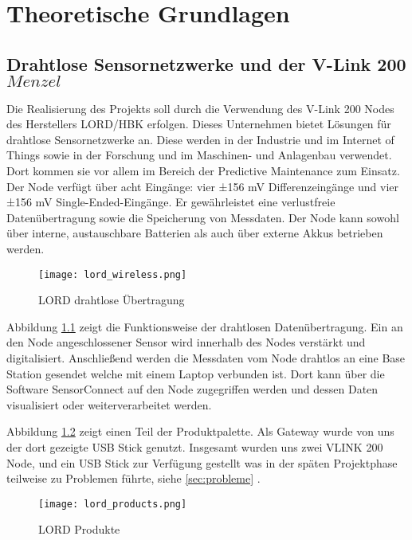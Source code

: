 \chapter{Theoretische Grundlagen}


\section{Drahtlose Sensornetzwerke und der V-Link 200 \(Menzel\)}

Die Realisierung des Projekts soll durch die Verwendung des V-Link 200 Nodes des Herstellers LORD/HBK erfolgen.
Dieses Unternehmen bietet Lösungen für drahtlose Sensornetzwerke an. Diese werden in der
Industrie und im Internet of Things sowie in der Forschung und im Maschinen- und Anlagenbau verwendet. Dort kommen sie vor allem im Bereich der Predictive Maintenance zum Einsatz.
Der Node verfügt über acht Eingänge: vier ±156 mV Differenzeingänge und vier ±156 mV Single-Ended-Eingänge. Er gewährleistet eine verlustfreie Datenübertragung sowie die Speicherung von Messdaten. Der Node kann sowohl über interne, austauschbare Batterien als auch über externe Akkus betrieben werden.

\begin{figure}[h]
    \begin{center}
        \texttt{[image: lord\_wireless.png]}
        \caption[LORD drahtlose Übertragung (Abbildungsverzeichnis)]{LORD drahtlose Übertragung
        \cite{VLInkManual}
        }
        \label{fig:lordwireless}
    \end{center}
\end{figure}

Abbildung \ref{fig:lordwireless} zeigt die Funktionsweise der drahtlosen Datenübertragung.
Ein an den Node angeschlossener Sensor wird innerhalb des Nodes verstärkt und digitalisiert.
Anschließend werden die Messdaten vom Node drahtlos an eine Base Station gesendet welche mit einem Laptop verbunden ist.
Dort kann über die Software SensorConnect auf den Node zugegriffen werden und dessen Daten visualisiert oder weiterverarbeitet werden.


Abbildung \ref{fig:lordproducts} zeigt einen Teil der Produktpalette.
Als Gateway wurde von uns der dort gezeigte USB Stick genutzt.
Insgesamt wurden uns zwei VLINK 200 Node, und ein USB Stick zur Verfügung gestellt was in der späten Projektphase teilweise zu Problemen führte,
siehe \ref{sec:probleme} .

\begin{figure}[h]
    \begin{center}
        \texttt{[image: lord\_products.png]}
        \caption[LORD Produkte (Abbildungsverzeichnis)]{LORD Produkte
        \cite{VLInkManual}
        }
        \label{fig:lordproducts}
    \end{center}
\end{figure}


